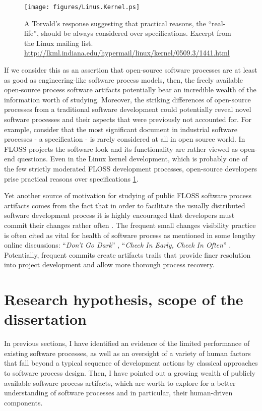 \begin{figure}[ht!]
   \centering
   \texttt{[image: figures/Linus.Kernel.ps]}
   \caption{A Torvald's response suggesting that practical reasons, the ``real-life'', should be always considered 
   over specifications.
   Excerpt from the Linux mailing list. \url{http://lkml.indiana.edu/hypermail/linux/kernel/0509.3/1441.html}}
   \label{fig:kernel}
\end{figure}

If we consider this as an assertion that open-source software processes are at least as good as engineering-like 
software process models, then, the freely available open-source process software artifacts potentially bear an 
incredible wealth of the information worth of studying. Moreover, the striking differences of open-source processes 
from a traditional software development could potentially reveal novel software processes and their aspects that 
were previously not accounted for. 
For example, consider that the most significant document in industrial software processes - a specification - 
is rarely considered at all in open source world. In FLOSS projects the software look and its functionality are 
rather viewed as open-end questions. Even in the Linux kernel development, which is probably one of the few strictly 
moderated FLOSS development processes, open-source developers prise practical reasons over specifications 
\ref{fig:kernel}.

Yet another source of motivation for studying of public FLOSS software process artifacts comes from the fact that 
in order to facilitate the usually distributed software development process it is highly encouraged that developers
must commit their changes rather often \cite{so-checkin} \cite{git-best-practices1}.
The frequent small changes visibility practice is often cited as vital for health of software process as mentioned 
in some lengthy online discussions: ``\textit{Don't Go Dark}'' \cite{checkin-dgd-2008}, 
``\textit{Check In Early, Check In Often}'' \cite{checkin-ch-2012}. Potentially, frequent commits create artifacts 
trails that provide finer resolution into project development and allow more thorough process recovery.

%
%
\section{Research hypothesis, scope of the dissertation}\label{section_research_hypothesis}
In previous sections, I have identified an evidence of the limited performance of existing software processes,
as well as an oversight of a variety of human factors that fall beyond a typical sequence of development 
actions by classical approaches to software process design.
Then, I have pointed out a growing wealth of publicly available software process artifacts, which 
are worth to explore for a better understanding of software processes and in particular, 
their human-driven components.

